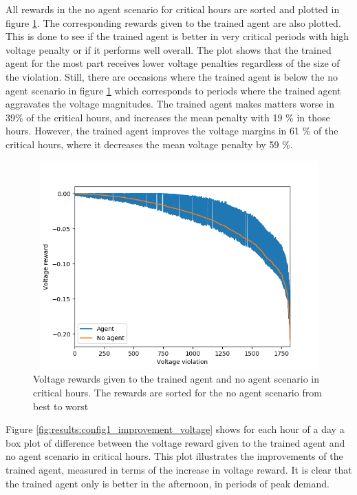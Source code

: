 \documentclass[class=book, crop=false]{standalone}
\begin{document}
All rewards in the no agent scenario for critical hours are sorted and plotted in figure \ref{fig:results:config1_sorted_voltage}. The corresponding rewards given to the trained agent are also plotted. This is done to see if the trained agent is better in very critical periods with high voltage penalty or if it performs well overall. The plot shows that the trained agent for the most part receives lower voltage penalties regardless of the size of the violation. Still, there are occasions where the trained agent is below the no agent scenario in figure \ref{fig:results:config1_sorted_voltage} which corresponds to periods where the trained agent aggravates the voltage magnitudes. The trained agent makes matters worse in 39\% of the critical hours, and increases the mean penalty with 19 \% in those hours. However, the trained agent improves the voltage margins in 61 \% of the critical hours, where it decreases the mean voltage penalty by 59 \%.



\begin{figure}[h]
    \center
\includegraphics[height=8cm, width=12cm]{figures/config1_sorted_voltage.png}
    \caption[size = 9]{Voltage rewards given to the trained agent and no agent scenario in critical hours. The rewards are sorted for the no agent scenario from best to worst}
    \label{fig:results:config1_sorted_voltage}
\end{figure}


Figure \ref{fig:results:config1_improvement_voltage} shows for each hour of a day a box plot of difference between the voltage reward given to the trained agent and no agent scenario in critical hours. This plot illustrates the improvements of the trained agent, measured in terms of the increase in voltage reward. It is clear that the trained agent only is better in the afternoon, in periods of peak demand. 
\end{document}
